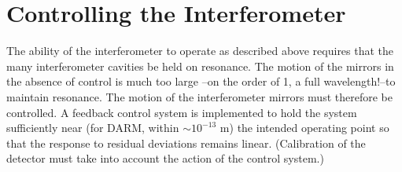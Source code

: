 







\section{Controlling the Interferometer}
The ability of the interferometer to operate as described above
requires that the many interferometer
cavities be held on resonance. The motion
of the mirrors in the absence of control is much too large 
--on the order of 1\micron, a full wavelength!--to maintain resonance.
The motion of the interferometer mirrors must therefore be controlled.
A feedback control system is implemented to hold the system sufficiently
near (for DARM, within $\sim 10^{-13}$ m) the intended operating point so that the response to residual
deviations remains linear.  (Calibration of the detector must take
into account the action of the control system.)


